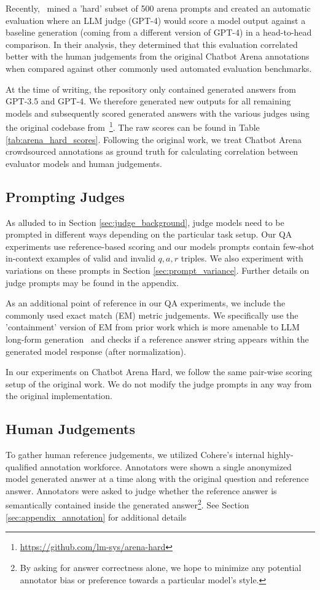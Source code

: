 \documentclass[11pt]{article}
\begin{document}
Recently,~\citet{arenahard2024} mined a 'hard' subset of 500 arena prompts and created an automatic evaluation where an LLM judge (GPT-4) would score a model output against a baseline generation (coming from a different version of GPT-4) in a head-to-head comparison. In their analysis, they determined that this evaluation correlated better with the human judgements from the original Chatbot Arena annotations when compared against other commonly used automated evaluation benchmarks. 

At the time of writing, the repository only contained generated answers from GPT-3.5 and GPT-4. We therefore generated new outputs for all remaining models and subsequently scored generated answers with the various judges using the original codebase from~\citet{arenahard2024}\footnote{\url{https://github.com/lm-sys/arena-hard}}. The raw scores can be found in Table \ref{tab:arena_hard_scores}. Following the original work, we treat Chatbot Arena crowdsourced annotations as ground truth for calculating correlation between evaluator models and human judgements.

\subsection{Prompting Judges}
As alluded to in Section \ref{sec:judge_background}, judge models need to be prompted in different ways depending on the particular task setup. Our QA experiments use reference-based scoring and our models prompts contain few-shot in-context examples of valid and invalid $q, a, r$ triples. We also experiment with variations on these prompts in Section \ref{sec:prompt_variance}. Further details on judge prompts may be found in the appendix.

As an additional point of reference in our QA experiments, we include the commonly used exact match (EM) metric judgements. We specifically use the 'containment' version of EM from prior work which is more amenable to LLM long-form generation~\citep{liu2024lost} and checks if a reference answer string appears within the generated model response (after normalization).

In our experiments on Chatbot Arena Hard, we follow the same pair-wise scoring setup of the original work. We do not modify the judge prompts in any way from the original implementation. 


\subsection{Human Judgements}
To gather human reference judgements, we utilized Cohere's internal highly-qualified annotation workforce. Annotators were shown a single anonymized model generated answer at a time along with the original question and reference answer. Annotators were asked to judge whether the reference answer is semantically contained inside the generated answer\footnote{By asking for answer correctness alone, we hope to minimize any potential annotator bias or preference towards a particular model's style.}.  See Section \ref{sec:appendix_annotation} for additional details 
\end{document}
